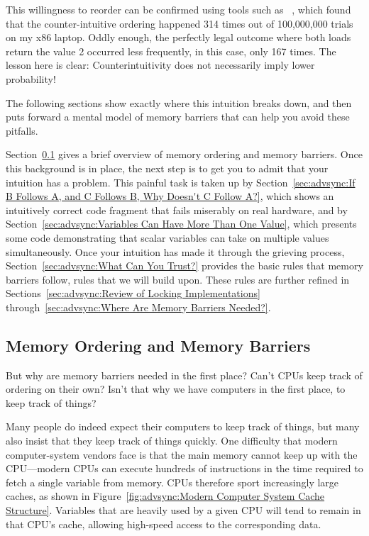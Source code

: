 This willingness to reorder can be confirmed using tools such as
~\cite{Alglave:2014:HCM:2594291.2594347},
which found that the counter-intuitive ordering happened
314 times out of 100,000,000 trials on my x86 laptop.
Oddly enough, the perfectly legal outcome where both loads return the
value 2 occurred less frequently, in this case, only 167 times.
The lesson here is clear: Counterintuitivity does not necessarily
imply lower probability!

The following sections show exactly where this intuition breaks down,
and then puts forward a mental model of memory barriers that can help
you avoid these pitfalls.

Section~\ref{sec:advsync:Memory Ordering and Memory Barriers}
gives a brief overview of memory ordering and memory barriers.
Once this background is in place, the next step is to get you to admit
that your intuition has a problem.
This painful task is taken up by
Section~\ref{sec:advsync:If B Follows A, and C Follows B, Why Doesn't C Follow A?},
which shows an intuitively correct code fragment that fails miserably
on real hardware, and by
Section~\ref{sec:advsync:Variables Can Have More Than One Value},
which presents some code demonstrating that scalar variables can
take on multiple values simultaneously.
Once your intuition has made it through the grieving process,
Section~\ref{sec:advsync:What Can You Trust?}
provides the basic rules that memory barriers follow, rules that we
will build upon.
These rules are further refined in
Sections~\ref{sec:advsync:Review of Locking Implementations}
through~\ref{sec:advsync:Where Are Memory Barriers Needed?}.

\subsection{Memory Ordering and Memory Barriers}
\label{sec:advsync:Memory Ordering and Memory Barriers}

But why are memory barriers needed in the first place?
Can't CPUs keep track of ordering on their own?
Isn't that why we have computers in the first place, to keep track of things?

Many people do indeed expect their computers to keep track of things,
but many also insist that they keep track of things quickly.
One difficulty that modern computer-system vendors face is that
the main memory cannot keep up with the CPU---modern CPUs can execute
hundreds of instructions in the time required to fetch a single variable
from memory.
CPUs therefore sport increasingly large caches, as shown in
Figure~\ref{fig:advsync:Modern Computer System Cache Structure}.
Variables that are heavily used by a given CPU will tend to remain
in that CPU's cache, allowing high-speed access to the corresponding
data.

